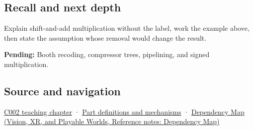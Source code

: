 \subsection{Recall and next depth}\label{appendix-a65290d66ed9-recall-and-next-depth}

Explain shift-and-add multiplication without the label, work the example above, then state the assumption whose removal would change the result.

\textbf{Pending:} Booth recoding, compressor trees, pipelining, and signed multiplication.

\subsection{Source and navigation}\label{appendix-a65290d66ed9-source-and-navigation}

\hyperref[01-foundations-i-ch001-arithmetic-becomes-a-policy]{C002 teaching chapter} · \hyperref[appendix-fd090d982a15]{Part definitions and mechanisms} · \href{../07-Vision-XR-and-Playable-Worlds/main.pdf\#nameddest=appendix-4ad47bdd269a}{Dependency Map (Vision, XR, and Playable Worlds, Reference notes: Dependency Map)}
